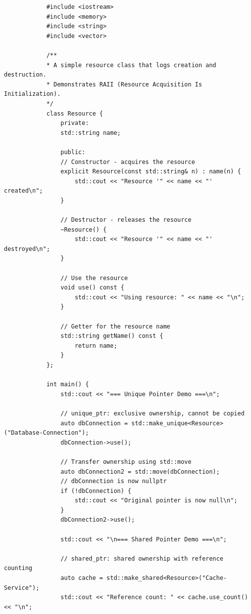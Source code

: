 \documentclass{matinbook}
\begin{document}
    \begin{latin}
        \begin{verbatim}
            #include <iostream>
            #include <memory>
            #include <string>
            #include <vector>
            
            /**
            * A simple resource class that logs creation and destruction.
            * Demonstrates RAII (Resource Acquisition Is Initialization).
            */
            class Resource {
                private:
                std::string name;
                
                public:
                // Constructor - acquires the resource
                explicit Resource(const std::string& n) : name(n) {
                    std::cout << "Resource '" << name << "' created\n";
                }
                
                // Destructor - releases the resource
                ~Resource() {
                    std::cout << "Resource '" << name << "' destroyed\n";
                }
                
                // Use the resource
                void use() const {
                    std::cout << "Using resource: " << name << "\n";
                }
                
                // Getter for the resource name
                std::string getName() const {
                    return name;
                }
            };
            
            int main() {
                std::cout << "=== Unique Pointer Demo ===\n";
                
                // unique_ptr: exclusive ownership, cannot be copied
                auto dbConnection = std::make_unique<Resource>("Database-Connection");
                dbConnection->use();
                
                // Transfer ownership using std::move
                auto dbConnection2 = std::move(dbConnection);
                // dbConnection is now nullptr
                if (!dbConnection) {
                    std::cout << "Original pointer is now null\n";
                }
                dbConnection2->use();
                
                std::cout << "\n=== Shared Pointer Demo ===\n";
                
                // shared_ptr: shared ownership with reference counting
                auto cache = std::make_shared<Resource>("Cache-Service");
                std::cout << "Reference count: " << cache.use_count() << "\n";
                

\end{verbatim}
\end{latin}
\end{document}
